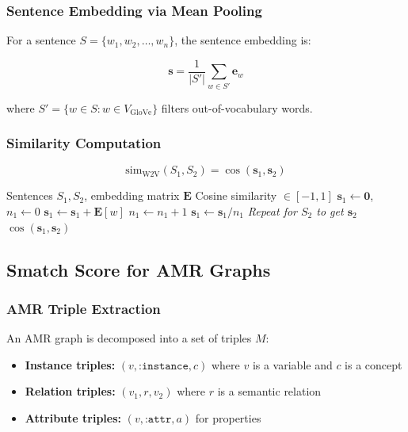 \documentclass[11pt,a4paper]{article}
\begin{document}
\subsubsection{Sentence Embedding via Mean Pooling}

For a sentence $S = \{w_1, w_2, \ldots, w_n\}$, the sentence embedding is:

\begin{equation}
\mathbf{s} = \frac{1}{|S'|} \sum_{w \in S'} \mathbf{e}_w
\end{equation}

where $S' = \{w \in S : w \in V_{\text{GloVe}}\}$ filters out-of-vocabulary words.

\subsubsection{Similarity Computation}

\begin{equation}
\text{sim}_{\text{W2V}}(S_1, S_2) = \cos(\mathbf{s}_1, \mathbf{s}_2)
\end{equation}

\begin{algorithm}[H]
\caption{Word2Vec Sentence Similarity}
\begin{algorithmic}[1]
\Require Sentences $S_1, S_2$, embedding matrix $\mathbf{E}$
\Ensure Cosine similarity $\in [-1, 1]$
\State $\mathbf{s}_1 \gets \mathbf{0}$, $n_1 \gets 0$
        \State $\mathbf{s}_1 \gets \mathbf{s}_1 + \mathbf{E}[w]$
        \State $n_1 \gets n_1 + 1$
    \EndIf
\EndFor
\State $\mathbf{s}_1 \gets \mathbf{s}_1 / n_1$ 
\State \textit{Repeat for $S_2$ to get $\mathbf{s}_2$}
\State \Return $\cos(\mathbf{s}_1, \mathbf{s}_2)$
\end{algorithmic}
\end{algorithm}

\subsection{Smatch Score for AMR Graphs}

\subsubsection{AMR Triple Extraction}

An AMR graph is decomposed into a set of triples $M$:
\begin{itemize}
    \item \textbf{Instance triples:} $(v, \texttt{:instance}, c)$ where $v$ is a variable and $c$ is a concept
    \item \textbf{Relation triples:} $(v_1, r, v_2)$ where $r$ is a semantic relation
    \item \textbf{Attribute triples:} $(v, \texttt{:attr}, a)$ for properties
\end{itemize}
\end{document}
